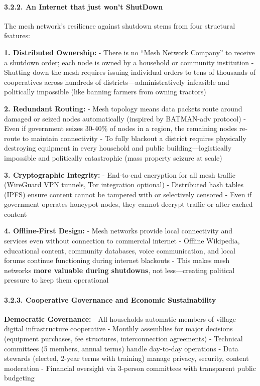 \paragraph{3.2.2. An Internet that just won't
ShutDown}\label{an-internet-that-just-wont-shutdown}

The mesh network's resilience against shutdown stems from four
structural features:

\textbf{1. Distributed Ownership:} - There is no ``Mesh Network
Company'' to receive a shutdown order; each node is owned by a household
or community institution - Shutting down the mesh requires issuing
individual orders to tens of thousands of cooperatives across hundreds
of districts---administratively infeasible and politically impossible
(like banning farmers from owning tractors)

\textbf{2. Redundant Routing:} - Mesh topology means data packets route
around damaged or seized nodes automatically (inspired by BATMAN-adv
protocol) - Even if government seizes 30-40\% of nodes in a region, the
remaining nodes re-route to maintain connectivity - To fully blackout a
district requires physically destroying equipment in every household and
public building---logistically impossible and politically catastrophic
(mass property seizure at scale)

\textbf{3. Cryptographic Integrity:} - End-to-end encryption for all
mesh traffic (WireGuard VPN tunnels, Tor integration optional) -
Distributed hash tables (IPFS) ensure content cannot be tampered with or
selectively censored - Even if government operates honeypot nodes, they
cannot decrypt traffic or alter cached content

\textbf{4. Offline-First Design:} - Mesh networks provide local
connectivity and services even without connection to commercial internet
- Offline Wikipedia, educational content, community databases, voice
communication, and local forums continue functioning during internet
blackouts - This makes mesh networks \textbf{more valuable during
shutdowns}, not less---creating political pressure to keep them
operational

\paragraph{3.2.3. Cooperative Governance and Economic
Sustainability}\label{cooperative-governance-and-economic-sustainability}

\textbf{Democratic Governance:} - All households automatic members of
village digital infrastructure cooperative - Monthly assemblies for
major decisions (equipment purchases, fee structures, interconnection
agreements) - Technical committees (5 members, annual terms) handle
day-to-day operations - Data stewards (elected, 2-year terms with
training) manage privacy, security, content moderation - Financial
oversight via 3-person committees with transparent public budgeting

